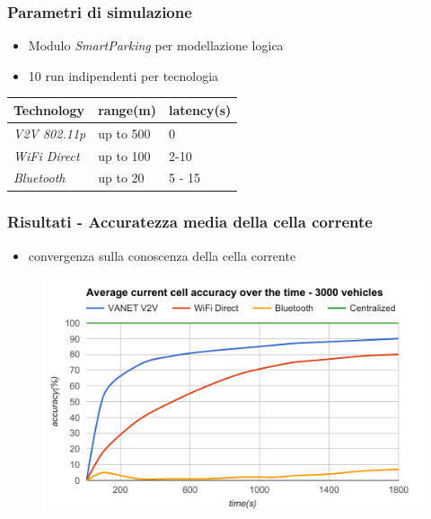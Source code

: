 \documentclass{beamer}
\begin{document}
\begin{frame}
\frametitle{Parametri di simulazione}
\begin{itemize}
\item Modulo \textit{SmartParking} per modellazione logica
\item 10 run indipendenti per tecnologia
\end{itemize}
\begin{table}
\begin{tabular}{l l l}
\toprule
\textbf{Technology} & \textbf{range(m)} & \textbf{latency(s)}\\
\midrule
\textit{V2V 802.11p} & up to 500 & 0 \\
\textit{WiFi Direct} & up to 100 & 2-10 \\
\textit{Bluetooth}  & up to 20 & 5 - 15 \\
\bottomrule
\end{tabular}
\end{table}
\end{frame}


\begin{frame}
  \frametitle{Risultati - Accuratezza media della cella corrente}
  \begin{itemize}
    \item convergenza sulla conoscenza della cella corrente
  \end{itemize}
  \begin{figure}
    \includegraphics[scale=0.45]{img/graphics/local_accuracy.png}
  \end{figure}
\end{frame}
\end{document}

